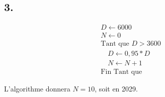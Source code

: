 \documentclass[10pt]{article}
\begin{document}
	\subsection*{3.}
	\begin{tcolorbox}[colback=white,colframe=black,left=1mm,right=1mm,top=1mm,bottom=1mm,boxsep=0mm]
		\[
		\begin{array}{l}
			D \leftarrow 6000 \\
			N \leftarrow 0 \\
			\text{Tant que } D > 3600 \\
			\quad D \leftarrow 0,95 * D \\
			\quad N \leftarrow N + 1 \\
			\text{Fin Tant que}
		\end{array}
		\]
	\end{tcolorbox}
	
	L'algorithme donnera \(N = 10\), soit en 2029.
\end{document}
